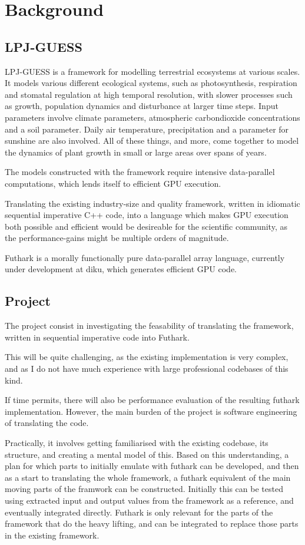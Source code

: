 \section{Background}
\subsection{LPJ-GUESS}
LPJ-GUESS is a framework for modelling terrestrial ecosystems at various scales.\cite{smith2001lpj} It models various different ecological systems, such as photosynthesis, respiration and stomatal regulation at high temporal resolution, with slower processes such as growth, population dynamics and disturbance at larger time steps. Input parameters involve climate parameters, atmospheric carbondioxide concentrations and a soil parameter. Daily air temperature, precipitation and a parameter for sunshine are also involved. All of these things, and more, come together to model the dynamics of plant growth in small or large areas over spans of years.

The models constructed with the framework require intensive data-parallel computations, which lends itself to efficient GPU execution.

Translating the existing industry-size and quality framework, written in idiomatic sequential imperative C++ code, into a language which makes GPU execution both possible and efficient would be desireable for the scientific community, as the performance-gains might be multiple orders of magnitude.

Futhark is a morally functionally pure data-parallel array language, currently under development at diku, which generates efficient GPU code\cite{futhark}.

\subsection{Project}
The project consist in investigating the feasability of translating the framework, written in sequential imperative code into Futhark.

This will be quite challenging, as the existing implementation is very complex, and as I do not have much experience with large professional codebases of this kind.

If time permits, there will also be performance evaluation of the resulting futhark implementation. However, the main burden of the project is software engineering of translating the code.

Practically, it involves getting familiarised with the existing codebase, its structure, and creating a mental model of this. Based on this understanding, a plan for which parts to initially emulate with futhark can be developed, and then as a start to translating the whole framework, a futhark equivalent of the main moving parts of the framwork can be constructed. Initially this can be tested using extracted input and output values from the framework as a reference, and eventually integrated directly. Futhark is only relevant for the parts of the framework that do the heavy lifting, and can be integrated to replace those parts in the existing framework.

